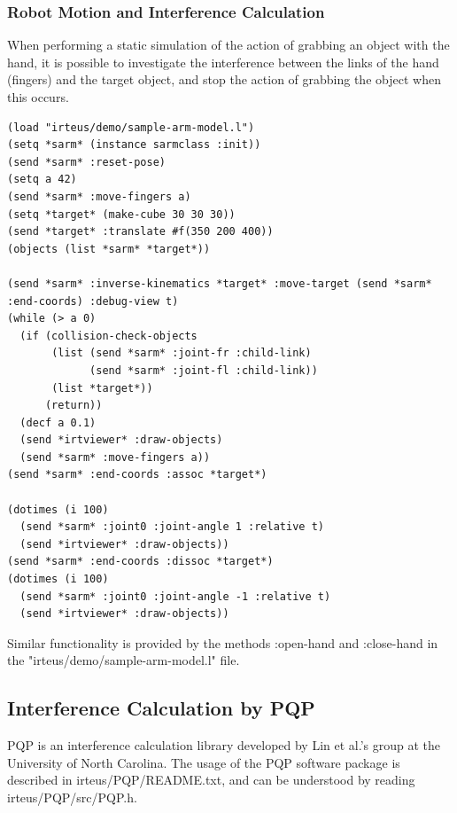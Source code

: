 \subsubsection{Robot Motion and Interference Calculation}
When performing a static simulation of the action of grabbing an object with the hand, it is possible to investigate the interference between the links of the hand (fingers) and the target object, and stop the action of grabbing the object when this occurs.

{\baselineskip=10pt
\begin{verbatim}
(load "irteus/demo/sample-arm-model.l")
(setq *sarm* (instance sarmclass :init))
(send *sarm* :reset-pose)
(setq a 42)
(send *sarm* :move-fingers a)
(setq *target* (make-cube 30 30 30))
(send *target* :translate #f(350 200 400))
(objects (list *sarm* *target*))

(send *sarm* :inverse-kinematics *target* :move-target (send *sarm* :end-coords) :debug-view t)
(while (> a 0)
  (if (collision-check-objects
       (list (send *sarm* :joint-fr :child-link)
             (send *sarm* :joint-fl :child-link))
       (list *target*))
      (return))
  (decf a 0.1)
  (send *irtviewer* :draw-objects)
  (send *sarm* :move-fingers a))
(send *sarm* :end-coords :assoc *target*)

(dotimes (i 100)
  (send *sarm* :joint0 :joint-angle 1 :relative t)
  (send *irtviewer* :draw-objects))
(send *sarm* :end-coords :dissoc *target*)
(dotimes (i 100)
  (send *sarm* :joint0 :joint-angle -1 :relative t)
  (send *irtviewer* :draw-objects))
\end{verbatim}
}

Similar functionality is provided by the methods :open-hand and :close-hand in the "irteus/demo/sample-arm-model.l" file.

\subsection{Interference Calculation by PQP}

PQP is an interference calculation library developed by Lin et al.'s group at the University of North Carolina. The usage of the PQP software package is described in irteus/PQP/README.txt, and can be understood by reading irteus/PQP/src/PQP.h.

